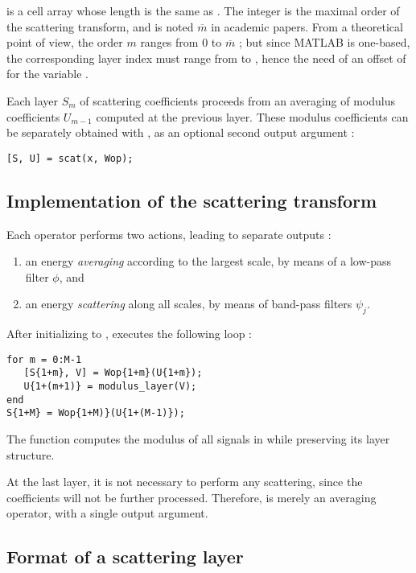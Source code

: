 \documentclass{article}
\begin{document}
 is a cell array whose length  is the same as . The integer  is the maximal order of the scattering transform, and is noted $\overline{m}$ in academic papers. From a theoretical point of view, the order $m$ ranges from $0$ to $\overline{m}$ ; but since MATLAB is one-based, the corresponding layer index must range from  to , hence the need of an offset of  for the variable .

Each layer $S_m$ of scattering coefficients proceeds from an averaging of modulus coefficients $U_{m-1}$ computed at the previous layer. These modulus coefficients can be separately obtained with , as an optional second output argument :

\begin{lstlisting}
[S, U] = scat(x, Wop);
\end{lstlisting}

\subsection{Implementation of the scattering transform}
Each operator  performs two actions, leading to separate outputs :
\begin{enumerate}
\item an energy \emph{averaging} according to the largest scale, by means of a low-pass filter $\phi$, and
\item an energy \emph{scattering} along all scales, by means of band-pass filters $\psi_j$.
\end{enumerate}

After initializing  to ,  executes the following loop :

\begin{lstlisting}
for m = 0:M-1
   [S{1+m}, V] = Wop{1+m}(U{1+m});
   U{1+(m+1)} = modulus_layer(V);
end
S{1+M} = Wop{1+M)}(U{1+(M-1)});
\end{lstlisting}

The function  computes the modulus of all signals in  while preserving its layer structure.

At the last layer, it is not necessary to perform any scattering, since the coefficients will not be further processed. Therefore,  is merely an averaging operator, with a single output argument.

\subsection{Format of a scattering layer}
\end{document}
